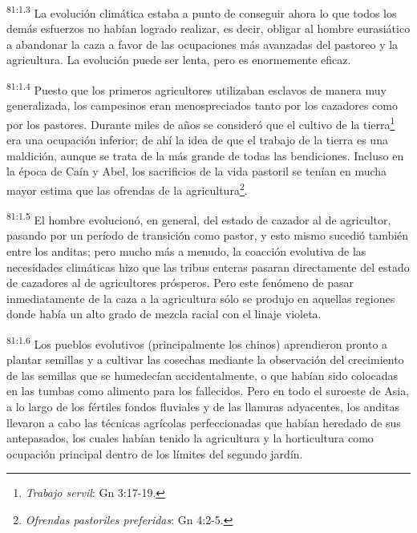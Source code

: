 \par
\textsuperscript{81:1.3} La evolución climática estaba a punto de conseguir ahora lo que todos los demás esfuerzos no habían logrado realizar, es decir, obligar al hombre eurasiático a abandonar la caza a favor de las ocupaciones más avanzadas del pastoreo y la agricultura. La evolución puede ser lenta, pero es enormemente eficaz.

\par
\textsuperscript{81:1.4} Puesto que los primeros agricultores utilizaban esclavos de manera muy generalizada, los campesinos eran menospreciados tanto por los cazadores como por los pastores. Durante miles de años se consideró que el cultivo de la tierra\footnote{\textit{Trabajo servil}: Gn 3:17-19.} era una ocupación inferior; de ahí la idea de que el trabajo de la tierra es una maldición, aunque se trata de la más grande de todas las bendiciones. Incluso en la época de Caín y Abel, los sacrificios de la vida pastoril se tenían en mucha mayor estima que las ofrendas de la agricultura\footnote{\textit{Ofrendas pastoriles preferidas}: Gn 4:2-5.}.

\par
\textsuperscript{81:1.5} El hombre evolucionó, en general, del estado de cazador al de agricultor, pasando por un período de transición como pastor, y esto mismo sucedió también entre los anditas; pero mucho más a menudo, la coacción evolutiva de las necesidades climáticas hizo que las tribus enteras pasaran directamente del estado de cazadores al de agricultores prósperos. Pero este fenómeno de pasar inmediatamente de la caza a la agricultura sólo se produjo en aquellas regiones donde había un alto grado de mezcla racial con el linaje violeta.

\par
\textsuperscript{81:1.6} Los pueblos evolutivos (principalmente los chinos) aprendieron pronto a plantar semillas y a cultivar las cosechas mediante la observación del crecimiento de las semillas que se humedecían accidentalmente, o que habían sido colocadas en las tumbas como alimento para los fallecidos. Pero en todo el suroeste de Asia, a lo largo de los fértiles fondos fluviales y de las llanuras adyacentes, los anditas llevaron a cabo las técnicas agrícolas perfeccionadas que habían heredado de sus antepasados, los cuales habían tenido la agricultura y la horticultura como ocupación principal dentro de los límites del segundo jardín.

